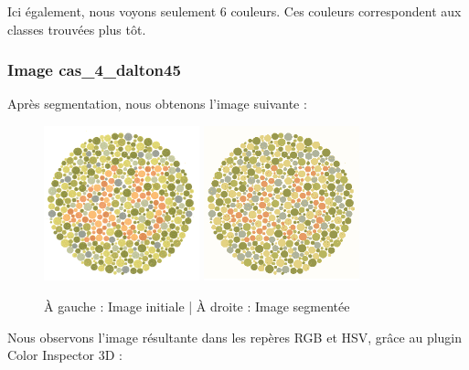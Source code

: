 \documentclass[a4paper]{article}
\begin{document}
Ici également, nous voyons seulement 6 couleurs. Ces couleurs correspondent aux classes trouvées plus tôt.

\clearpage
\subsubsection{Image cas\_4\_dalton45}

Après segmentation, nous obtenons l'image suivante :

\begin{figure}[H]
\begin{center}
\includegraphics[width=170px]{../base/cas_4_dalton45.png}
\includegraphics[width=170px]{../resultats/cas_4_dalton45.png}
\end{center}
\caption{À gauche : Image initiale | À droite : Image segmentée}
\end{figure}

Nous observons l'image résultante dans les repères RGB et HSV, grâce au plugin Color Inspector 3D :
\end{document}
